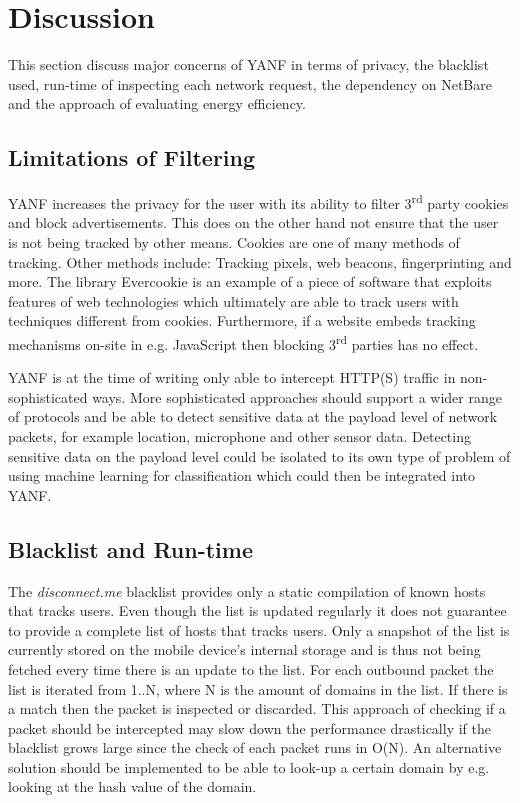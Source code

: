 \documentclass[main.tex]{subfiles}
\begin{document}
\section{Discussion}
\label{sec:discussion}

This section discuss major concerns of YANF in terms of privacy, the blacklist used, run-time of inspecting each network request, the dependency on NetBare and the approach of evaluating energy efficiency.


\subsection{Limitations of Filtering}
YANF increases the privacy for the user with its ability to filter 3\textsuperscript{rd} party cookies and block advertisements. This does on the other hand not ensure that the user is not being tracked by other means. Cookies are one of many methods of tracking. Other methods include: Tracking pixels, web beacons, fingerprinting and more. The library Evercookie is an example of a piece of software that exploits features of web technologies which ultimately are able to track users with techniques different from cookies. Furthermore, if a website embeds tracking mechanisms on-site in e.g. JavaScript then blocking 3\textsuperscript{rd} parties has no effect.

YANF is at the time of writing only able to intercept HTTP(S) traffic in non-sophisticated ways. More sophisticated approaches should support a wider range of protocols and be able to detect sensitive data at the payload level of network packets, for example location, microphone and other sensor data. Detecting sensitive data on the payload level could be isolated to its own type of problem of using machine learning for classification which could then be integrated into YANF.

\subsection{Blacklist and Run-time}
The \textit{disconnect.me} blacklist provides only a static compilation of known hosts that tracks users. Even though the list is updated regularly it does not guarantee to provide a complete list of hosts that tracks users. Only a snapshot of the list is currently stored on the mobile device's internal storage and is thus not being fetched every time there is an update to the list. For each outbound packet the list is iterated from 1..N, where N is the amount of domains in the list. If there is a match then the packet is inspected or discarded. This approach of checking if a packet should be intercepted may slow down the performance drastically if the blacklist grows large since the check of each packet runs in O(N). An alternative solution should be implemented to be able to look-up a certain domain by e.g. looking at the hash value of the domain.
\end{document}
